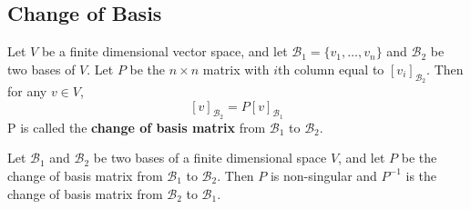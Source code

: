 \documentclass{article}
\begin{document}
\subsection{Change of Basis}
\begin{theorem}
  Let $V$ be a finite dimensional vector space, and let $\mathcal{B}_1 = \{v_1, \ldots, v_n\}$ and $\mathcal{B}_2$ be two bases of $V$. Let $P$ be the $n \times n$ matrix with $i$th column equal to $[v_i]_{\mathcal{B}_2}$. Then for any $v \in V$, \[
    [v]_{\mathcal{B}_2} = P[v]_{\mathcal{B}_1}
  \]
  P is called the \textbf{change of basis matrix} from $\mathcal{B}_1$ to $\mathcal{B}_2$.
\end{theorem}
\begin{theorem}
  Let $\mathcal{B}_1$ and $\mathcal{B}_2$ be two bases of a finite dimensional space $V$, and let $P$ be the change of basis matrix from $\mathcal{B}_1$ to $\mathcal{B}_2$. Then $P$ is non-singular and $P^{-1}$ is the change of basis matrix from $\mathcal{B}_2$ to $\mathcal{B}_1$.
\end{theorem}
\end{document}
